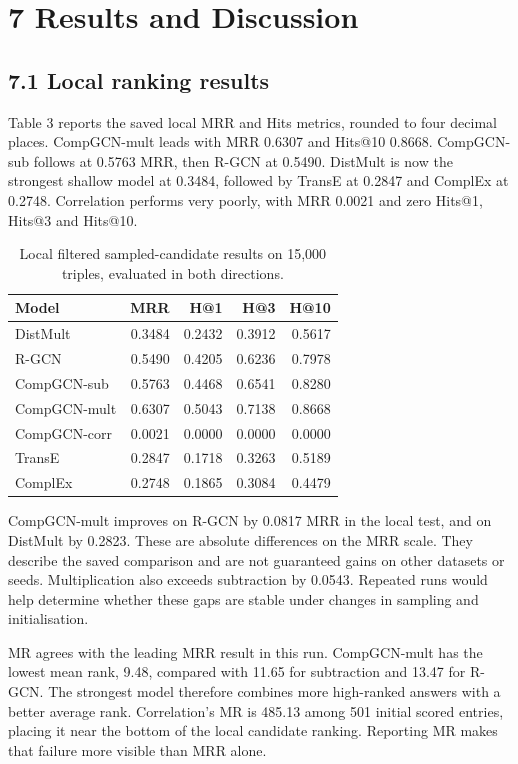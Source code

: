 \documentclass[11pt]{article}
\begin{document}
\section*{7 Results and Discussion}
\subsection*{7.1 Local ranking results}
Table 3 reports the saved local MRR and Hits metrics, rounded to four decimal places. CompGCN-mult leads with MRR 0.6307 and Hits@10 0.8668. CompGCN-sub follows at 0.5763 MRR, then R-GCN at 0.5490. DistMult is now the strongest shallow model at 0.3484, followed by TransE at 0.2847 and ComplEx at 0.2748. Correlation performs very poorly, with MRR 0.0021 and zero Hits@1, Hits@3 and Hits@10.

\begin{table}[t]\centering\small
\setlength{\tabcolsep}{3pt}
\begin{tabular}{lrrrr}
\toprule
Model & MRR & H@1 & H@3 & H@10 \\ \midrule
DistMult & 0.3484 & 0.2432 & 0.3912 & 0.5617 \\
R-GCN & 0.5490 & 0.4205 & 0.6236 & 0.7978 \\
CompGCN-sub & 0.5763 & 0.4468 & 0.6541 & 0.8280 \\
CompGCN-mult & 0.6307 & 0.5043 & 0.7138 & 0.8668 \\
CompGCN-corr & 0.0021 & 0.0000 & 0.0000 & 0.0000 \\
TransE & 0.2847 & 0.1718 & 0.3263 & 0.5189 \\
ComplEx & 0.2748 & 0.1865 & 0.3084 & 0.4479 \\
\bottomrule\end{tabular}
\caption{Local filtered sampled-candidate results on 15,000 triples, evaluated in both directions.}\end{table}
CompGCN-mult improves on R-GCN by 0.0817 MRR in the local test, and on DistMult by 0.2823. These are absolute differences on the MRR scale. They describe the saved comparison and are not guaranteed gains on other datasets or seeds. Multiplication also exceeds subtraction by 0.0543. Repeated runs would help determine whether these gaps are stable under changes in sampling and initialisation.

MR agrees with the leading MRR result in this run. CompGCN-mult has the lowest mean rank, 9.48, compared with 11.65 for subtraction and 13.47 for R-GCN. The strongest model therefore combines more high-ranked answers with a better average rank. Correlation's MR is 485.13 among 501 initial scored entries, placing it near the bottom of the local candidate ranking. Reporting MR makes that failure more visible than MRR alone.
\end{document}
